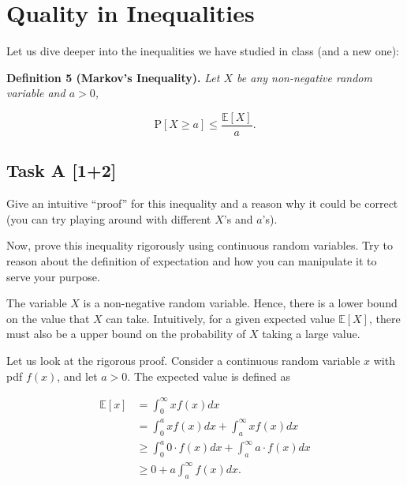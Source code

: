 \chapter{Quality in Inequalities}

\begin{tcolorbox}[title=]
    Let us dive deeper into the inequalities we have studied in class (and a new
    one):

    \vspace{10pt}
    \begin{mdframed}[backgroundcolor=lightblue, linecolor=blue, linewidth=1.5pt]
        \textbf{Definition 5 (Markov's Inequality).}
        \textit{Let $X$ be any non-negative random variable and $a > 0$,}
        
        \begin{equation*}
            \text{P}[X \ge a] \le \dfrac{\mathbb{E}[X]}{a}.
        \end{equation*}
    \end{mdframed}
\end{tcolorbox}

\section*{\colS{$\S$} Task A \hfill \normalfont \large [1+2]}

\begin{tcolorbox}
    Give an intuitive \enquote{proof} for this inequality and a reason why it
    could be correct (you can try playing around with different $ X$'s and $a$'s).
    
    Now, prove this inequality rigorously using continuous random variables. Try
    to reason about the definition of expectation and how you can manipulate it
    to serve your purpose.
\end{tcolorbox}


The variable $X$ is a non-negative random variable. Hence, there is a lower bound
on the value that $X$ can take. Intuitively, for a given expected value
$\mathbb{E}[X]$, there must also be a upper bound on the probability of $X$
taking a large value.

Let us look at the rigorous proof. Consider a continuous random variable $x$ with
pdf $f(x)$, and let $a>0$. The expected value is defined as

\begin{equation*}
    \begin{aligned}
        \mathbb{E}[x] &= \int_{0}^{\infty}xf(x)dx \\
        &= \int_{0}^{a}xf(x)dx + \int_{a}^{\infty}xf(x)dx \\
        &\ge \int_{0}^{a}0\cdot f(x)dx + \int_{a}^{\infty}a\cdot f(x)dx \\
        &\ge 0+a\int_{a}^{\infty}f(x)dx.
    \end{aligned}
\end{equation*}


